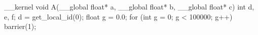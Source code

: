 __kernel void A(__global float* a, __global float* b, __global float* c) {
  int d, e, f;	
  d = get_local_id(0);
  float g = 0.0;
  for (int g = 0; g < 100000; g++) {
    barrier(1);
  }
}